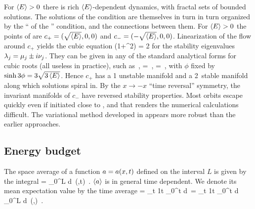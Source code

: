 For $\left\langle {E} \right\rangle>0$ there is rich
$\left\langle {E} \right\rangle$-dependent dynamics, with
fractal sets of bounded solutions.
The solutions of the {\eqv}  condition 
 are themselves in turn  in turn organized by the  
``{\eqva}  of the {\eqv}''  condition, and 
the connections between them.
    For $\left\langle {E} \right\rangle>0$ the {\eqv}  points of  are
$c_{+}=(\sqrt{\left\langle {E} \right\rangle},0,0)$ and $c_{-}=(-\sqrt{\left\langle {E} \right\rangle},0,0)$.
Linearization of the flow around
$c_{+}$ yields the cubic equation
  \beq
\eigExp(1+\eigExp^2) = 2
for the 
stability eigenvalues 
$\eigExp[j] = \eigRe[j] \pm i \eigIm[j]$.
They can
be given in any of the standard analytical forms for cubic
roots  (all useless in practice), such as
    \,,\qquad
\eigRe=\sinh \phi
\,,\qquad
\eigIm=\cosh \phi \, ,
with $\phi$ fixed by $\sinh 3\phi=3\sqrt{3\expct{E}}$. 
Hence $c_{+}$ has a {1\dmn}
unstable manifold and a 2\dmn\ stable manifold 
along which solutions spiral in. 
By the $x \to -x$ ``time reversal'' symmetry, the 
invariant manifolds of $c_{-}$ 
have reversed stability properties.
Most orbits escape quickly even if initiated close to \eqva, and that
renders the numerical calculations 
difficult.
The variational method
developed in 
appears more robust than
the earlier approaches.

\subsection{Energy budget} %
\label{sec:energy}

%
The {space average} of a function $\obser = \obser(\pSpace,t)$ defined on
the interval $L$ is given by the integral
\beq
	\expct{\obser} = \int_0^{L} d\pSpace\, \obser(\pSpace,t)
	\,.
	\label{rpo:spac_ave}
\eeq
$\left\langle {a} \right\rangle$ is in general time dependent. We denote
its mean expectation value by the {time average} 
\beq
\timeAver{\obser}
	= 
\lim_{t\rightarrow \infty} {1\over t} \int_0^t \; d\tau \, \expct{\obser}
	=
\lim_{t\rightarrow \infty} {1\over t} \int_0^t d\tau \,
	\int_0^{L} d\pSpace\, \obser(\pSpace,\tau) 
	\,.
\label{rpo:tim_ave}
\eeq

